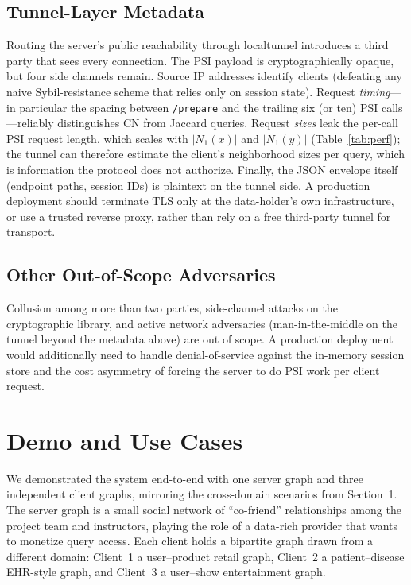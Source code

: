 \documentclass[sigconf]{acmart}
\begin{document}
\subsection{Tunnel-Layer Metadata}
\label{sec:tunnel-leakage}
Routing the server's public reachability through localtunnel introduces a third party that sees every connection. The PSI payload is cryptographically opaque, but four side channels remain. Source IP addresses identify clients (defeating any naive Sybil-resistance scheme that relies only on session state). Request \emph{timing}---in particular the spacing between \texttt{/prepare} and the trailing six (or ten) PSI calls---reliably distinguishes CN from Jaccard queries. Request \emph{sizes} leak the per-call PSI request length, which scales with $|N_1(x)|$ and $|N_1(y)|$ (Table~\ref{tab:perf}); the tunnel can therefore estimate the client's neighborhood sizes per query, which is information the protocol does not authorize. Finally, the JSON envelope itself (endpoint paths, session IDs) is plaintext on the tunnel side. A production deployment should terminate TLS only at the data-holder's own infrastructure, or use a trusted reverse proxy, rather than rely on a free third-party tunnel for transport.

\subsection{Other Out-of-Scope Adversaries}
Collusion among more than two parties, side-channel attacks on the cryptographic library, and active network adversaries (man-in-the-middle on the tunnel beyond the metadata above) are out of scope. A production deployment would additionally need to handle denial-of-service against the in-memory session store and the cost asymmetry of forcing the server to do PSI work per client request.

\section{Demo and Use Cases}
\label{sec:demo}

We demonstrated the system end-to-end with one server graph and three independent client graphs, mirroring the cross-domain scenarios from Section~1. The server graph is a small social network of ``co-friend'' relationships among the project team and instructors, playing the role of a data-rich provider that wants to monetize query access. Each client holds a bipartite graph drawn from a different domain: Client~1 a user--product retail graph, Client~2 a patient--disease EHR-style graph, and Client~3 a user--show entertainment graph.
\end{document}
